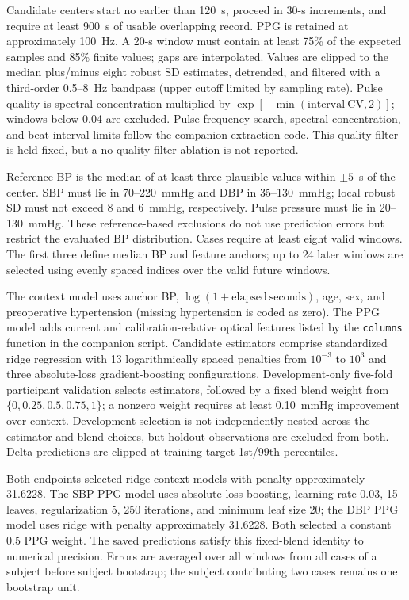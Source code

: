 Candidate centers start no earlier than 120~s, proceed in 30-s increments, and require at least 900~s of usable overlapping record. PPG is retained at approximately 100~Hz. A 20-s window must contain at least 75\% of the expected samples and 85\% finite values; gaps are interpolated. Values are clipped to the median plus/minus eight robust SD estimates, detrended, and filtered with a third-order 0.5--8~Hz bandpass (upper cutoff limited by sampling rate). Pulse quality is spectral concentration multiplied by $\exp[-\min(\mathrm{interval\ CV},2)]$; windows below 0.04 are excluded. Pulse frequency search, spectral concentration, and beat-interval limits follow the companion extraction code. This quality filter is held fixed, but a no-quality-filter ablation is not reported.

Reference BP is the median of at least three plausible values within $\pm5$~s of the center. SBP must lie in 70--220~mmHg and DBP in 35--130~mmHg; local robust SD must not exceed 8 and 6~mmHg, respectively. Pulse pressure must lie in 20--130~mmHg. These reference-based exclusions do not use prediction errors but restrict the evaluated BP distribution. Cases require at least eight valid windows. The first three define median BP and feature anchors; up to 24 later windows are selected using evenly spaced indices over the valid future windows.

The context model uses anchor BP, $\log(1+\mathrm{elapsed\ seconds})$, age, sex, and preoperative hypertension (missing hypertension is coded as zero). The PPG model adds current and calibration-relative optical features listed by the \texttt{columns} function in the companion script. Candidate estimators comprise standardized ridge regression with 13 logarithmically spaced penalties from $10^{-3}$ to $10^3$ and three absolute-loss gradient-boosting configurations. Development-only five-fold participant validation selects estimators, followed by a fixed blend weight from $\{0,0.25,0.5,0.75,1\}$; a nonzero weight requires at least 0.10~mmHg improvement over context. Development selection is not independently nested across the estimator and blend choices, but holdout observations are excluded from both. Delta predictions are clipped at training-target 1st/99th percentiles.

Both endpoints selected ridge context models with penalty approximately 31.6228. The SBP PPG model uses absolute-loss boosting, learning rate 0.03, 15 leaves, regularization 5, 250 iterations, and minimum leaf size 20; the DBP PPG model uses ridge with penalty approximately 31.6228. Both selected a constant 0.5 PPG weight. The saved predictions satisfy this fixed-blend identity to numerical precision. Errors are averaged over all windows from all cases of a subject before subject bootstrap; the subject contributing two cases remains one bootstrap unit.

